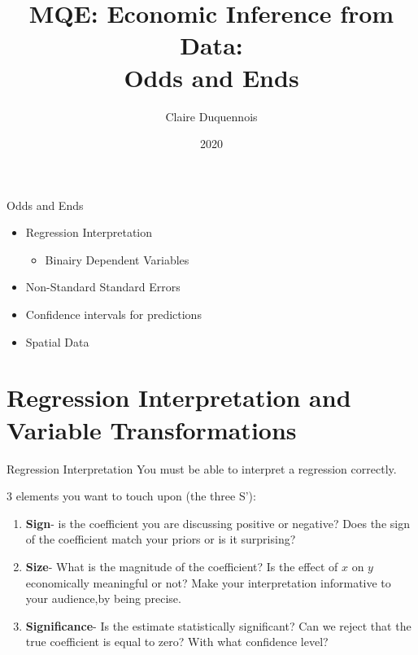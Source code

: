 \documentclass[
  ignorenonframetext,
]{beamer}
\title{MQE: Economic Inference from Data:\\
Odds and Ends}
\author{Claire Duquennois}
\date{2020}
\providecommand{\tightlist}{%
  \setlength{\itemsep}{0pt}\setlength{\parskip}{0pt}}
\begin{document}
\frame{\titlepage}

\begin{frame}{Odds and Ends}
\protect\hypertarget{odds-and-ends}{}
\begin{itemize}
\item
  Regression Interpretation

  \begin{itemize}
  \tightlist
  \item
    Binairy Dependent Variables
  \end{itemize}
\item
  Non-Standard Standard Errors
\item
  Confidence intervals for predictions
\item
  Spatial Data
\end{itemize}
\end{frame}

\hypertarget{regression-interpretation-and-variable-transformations}{%
\section{Regression Interpretation and Variable
Transformations}\label{regression-interpretation-and-variable-transformations}}

\begin{frame}{Regression Interpretation}
\protect\hypertarget{regression-interpretation}{}
You must be able to interpret a regression correctly.

3 elements you want to touch upon (the three S'):

\begin{enumerate}
[1)]
\item
  \textbf{Sign}- is the coefficient you are discussing positive or
  negative? Does the sign of the coefficient match your priors or is it
  surprising?
\item
  \textbf{Size}- What is the magnitude of the coefficient? Is the effect
  of \(x\) on \(y\) economically meaningful or not? Make your
  interpretation informative to your audience,by being precise.
\item
  \textbf{Significance}- Is the estimate statistically significant? Can
  we reject that the true coefficient is equal to zero? With what
  confidence level?
\end{enumerate}
\end{frame}
\end{document}
